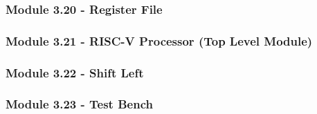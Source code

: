 \documentclass[12pt]{article}
\begin{document}
\subsubsection*{\large Module 3.20 - Register File}

\subsubsection*{\large Module 3.21 - RISC-V Processor (Top Level Module)}

\subsubsection*{\large Module 3.22 - Shift Left}

\subsubsection*{\large Module 3.23 - Test Bench}

\end{document}
